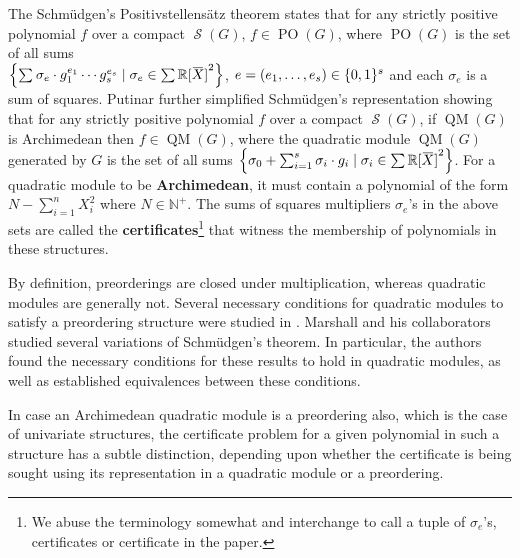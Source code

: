\documentclass[preprint,12pt,authoryear]{elsarticle}
\newcommand{\overbar}[1]{\mkern 1.5mu\overline{\mkern-1.5mu #1 \mkern-1.5mu}\mkern 1.5mu}
\newcommand{\rXY}{\mathbb{R}[\overbar{X}]}
\DeclarePairedDelimiter{\set}{\lbrace}{\rbrace}
\DeclareMathOperator{\quadmod}{QM}
\DeclareMathOperator{\preord}{PO}
\DeclareMathOperator{\semialgebraic}{\mathcal{S}}
\begin{document}
The Schm\"udgen's Positivstellens\"atz theorem \cite{Schmdgen1991TheKmomentPF}
states that for any strictly positive polynomial $f$ over a compact
$\semialgebraic(G)$, $f \in \preord(G)$, where $\preord(G)$ is the set of all
sums \\
$\set*{\sum_{}^{}{\sigma_e \cdot g_1^{e_1} \cdots g_s^{e_s} \mid \sigma_e \in
    \sum{\rXY}^2}}$, $e = (e_1, \dots, e_s) \in \set{0, 1}^{s}$ and each
$\sigma_e$ is a sum of squares.  Putinar further simplified Schm\"udgen's
representation showing that for any strictly positive polynomial $f$ over a
compact $\semialgebraic(G)$, if $\quadmod(G)$ is Archimedean then
$f \in \quadmod(G)$, where the quadratic module $\quadmod(G)$ generated by $G$
is the set of all sums
$\set*{\sigma_0 + \sum_{i=1}^{s}{\sigma_i \cdot g_i \mid \sigma_i \in
    \sum{\rXY}^2}}$.  For a quadratic module to be \textbf{Archimedean}, it must
contain a polynomial of the form $N - \sum_{i=1}^{n}{X_i^{2}}$ where
$N \in \mathbb{N}^{+}$. The sums of squares multipliers $\sigma_e$'s in the
above sets are called the \textbf{certificates}\footnote{We abuse the
  terminology somewhat and interchange to call a tuple of $\sigma_e$'s,
  certificates or certificate in the paper.}  that witness the membership of
polynomials in these structures.

By definition, preorderings are closed under multiplication, whereas quadratic
modules are generally not. Several necessary conditions for quadratic modules to
satisfy a preordering structure were studied in \cite{ScheidererDistinguished2005}.
Marshall and his collaborators \cite{marshall2002,marshall2005} studied several
variations of Schm\"udgen's theorem. In particular, the authors found the
necessary conditions for these results to hold in quadratic modules, as well as
established equivalences between these conditions.

In case an Archimedean quadratic module is a preordering also, which is the case of
univariate structures, the certificate problem for a given polynomial in such a
structure has a subtle distinction, depending upon whether the certificate is
being sought using its representation in a quadratic module or a preordering.
\end{document}
